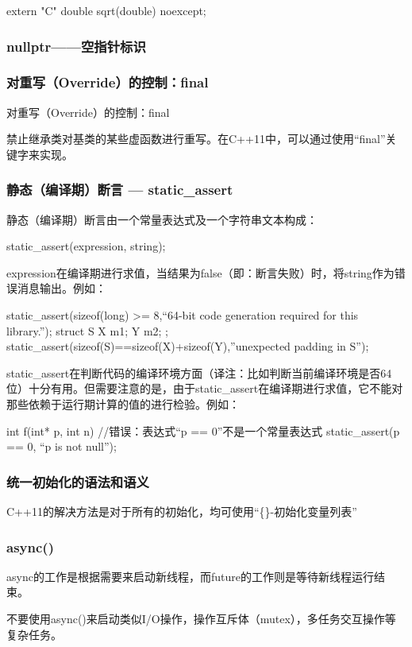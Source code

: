 extern "C" double sqrt(double) noexcept;

\subsubsection{nullptr——空指针标识}

\subsubsection{对重写（Override）的控制：final}
对重写（Override）的控制：final

禁止继承类对基类的某些虚函数进行重写。在C++11中，可以通过使用“final”关键字来实现。

\subsubsection{静态（编译期）断言 — static_assert}
静态（编译期）断言由一个常量表达式及一个字符串文本构成：
\begin{Code}
	static_assert(expression, string);
\end{Code}
expression在编译期进行求值，当结果为false（即：断言失败）时，将string作为错误消息输出。例如：

\begin{Code}
	static_assert(sizeof(long) >= 8,“64-bit code generation required for this library.”);
	struct S { X m1; Y m2; };
	static_assert(sizeof(S)==sizeof(X)+sizeof(Y),”unexpected padding in S”);
\end{Code}
static_assert在判断代码的编译环境方面（译注：比如判断当前编译环境是否64位）十分有用。但需要注意的是，由于static_assert在编译期进行求值，它不能对那些依赖于运行期计算的值的进行检验。例如：

\begin{Code}
	int f(int* p, int n){
		//错误：表达式“p == 0”不是一个常量表达式
		static_assert(p == 0, “p is not null”);
	}
\end{Code}
\subsubsection{统一初始化的语法和语义}
C++11的解决方法是对于所有的初始化，均可使用“\{\}-初始化变量列表”
\subsubsection{async()}
async的工作是根据需要来启动新线程，而future的工作则是等待新线程运行结束。

不要使用async()来启动类似I/O操作，操作互斥体（mutex），多任务交互操作等复杂任务。

